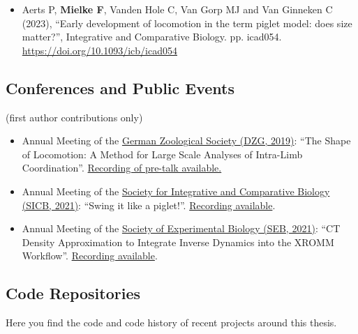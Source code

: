 \begin{change}
\begin{itemize}
\item Aerts P, \textbf{Mielke F}, Vanden Hole C, Van Gorp MJ and Van Ginneken C (2023), ``Early development of locomotion in the term piglet model: does size matter?'', Integrative and Comparative Biology. pp. icad054. \url{https://doi.org/10.1093/icb/icad054}
\end{itemize}
\subsection{Conferences and Public Events}
\label{sec:orge7b2615}
(first author contributions only)

\begin{itemize}
\item Annual Meeting of the \href{https://www.dzg-ev.de/veranstaltungen/jahrestagungen}{German Zoological Society (DZG, 2019)}: ``The Shape of Locomotion: A Method for Large Scale Analyses of Intra-Limb Coordination''. \href{http://mielke-bio.info/falk/posts/05.dzg}{Recording of pre-talk available.}

\item Annual Meeting of the \href{https://sicb.org/meetings/sicb-annual-meeting-2021/}{Society for Integrative and Comparative Biology (SICB, 2021)}: ``Swing it like a piglet!''. \href{http://mielke-bio.info/falk/posts/29.sicb2021}{Recording available}.

\item Annual Meeting of the \href{https://www.sebiology.org/resource/seb-2021-annual-conference.html}{Society of Experimental Biology (SEB, 2021)}: ``CT Density Approximation to Integrate Inverse Dynamics into the XROMM Workflow''. \href{http://mielke-bio.info/falk/posts/26.seb2021}{Recording available}.
\end{itemize}
\subsection{Code Repositories}
\label{sec:org598f2f1}
Here you find the code and code history of recent projects around this thesis.


\end{change}

